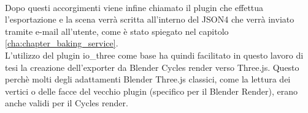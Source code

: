 \\
Dopo questi accorgimenti viene infine chiamato il plugin che effettua l’esportazione e la scena verrà scritta all’interno del JSON4 che verrà inviato tramite e-mail all’utente, come è stato spiegato nel capitolo \ref{cha:chapter_baking_service}.
\\
L’utilizzo del plugin io\_three come base ha quindi facilitato in questo lavoro di tesi la creazione dell’exporter da Blender Cycles render verso Three.js. 
Questo perchè molti degli adattamenti Blender Three.js classici, come la lettura dei vertici o delle facce del vecchio plugin (specifico per il Blender Render), erano anche validi per il Cycles render.